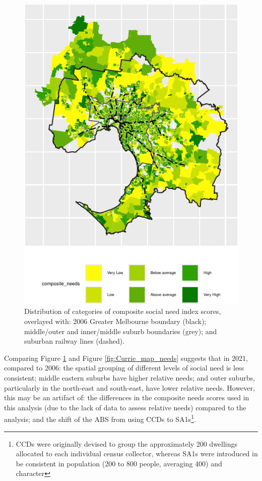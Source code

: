 \documentclass[preprint, 3p,
authoryear]{elsarticle} %
\begin{document}
\begin{figure}
\includegraphics[width=0.9\linewidth]{Leveraging_GTFS_to_assess_transit_supply_Transport_Geography_files/figure-latex/Greater_Melbourne_2021_social_needs-1} \caption{Distribution of categories of composite social need index scores, overlayed with: 2006 Greater Melbourne boundary (black); middle/outer and inner/middle suburb boundaries (grey); and suburban railway lines (dashed).}\label{fig:Greater_Melbourne_2021_social_needs}
\end{figure}

Comparing Figure \ref{fig:Greater_Melbourne_2021_social_needs} and
Figure \ref{fig:Currie_map_needs} suggests that in 2021, compared to
2006: the spatial grouping of different levels of social need is less
consistent; middle eastern suburbs have higher relative needs; and outer
suburbs, particularly in the north-east and south-east, have lower
relative needs. However, this may be an artifact of: the differences in
the composite needs scores used in this analysis (due to the lack of
data to assess relative needs) compared to the
\citet{currie2010identifying} analysis; and the shift of the ABS from
using CCDs to SA1s\footnote{CCDs were originally devised to group the
  approximately 200 dwellings allocated to each individual census
  collector, whereas SA1s were introduced in be consistent in population
  (200 to 800 people, averaging 400) and character\citep{ABS_SA1s_CCDs}}.
\end{document}
